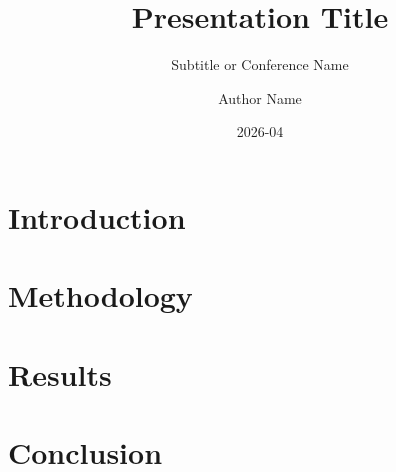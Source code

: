 \documentclass[aspectratio=169]{beamer}
\title{Presentation Title}
\subtitle{Subtitle or Conference Name}
\author{Author Name}
\institute{CLS -- Collecte Localisation Satellites}
\date{2026-04}
\begin{document}




\section{Introduction}



\section{Methodology}





\section{Results}





\section{Conclusion}




\end{document}
